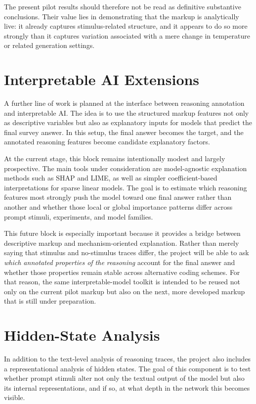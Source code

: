 \documentclass[14pt,a4paper]{extarticle}
\begin{document}
The present pilot results should therefore not be read as definitive substantive conclusions. Their value lies in demonstrating that the markup is analytically live: it already captures stimulus-related structure, and it appears to do so more strongly than it captures variation associated with a mere change in temperature or related generation settings.

\section{Interpretable AI Extensions}

A further line of work is planned at the interface between reasoning annotation and interpretable AI. The idea is to use the structured markup features not only as descriptive variables but also as explanatory inputs for models that predict the final survey answer. In this setup, the final answer becomes the target, and the annotated reasoning features become candidate explanatory factors.

At the current stage, this block remains intentionally modest and largely prospective. The main tools under consideration are model-agnostic explanation methods such as SHAP and LIME, as well as simpler coefficient-based interpretations for sparse linear models. The goal is to estimate which reasoning features most strongly push the model toward one final answer rather than another and whether those local or global importance patterns differ across prompt stimuli, experiments, and model families.

This future block is especially important because it provides a bridge between descriptive markup and mechanism-oriented explanation. Rather than merely saying that stimulus and no-stimulus traces differ, the project will be able to ask \emph{which annotated properties of the reasoning} account for the final answer and whether those properties remain stable across alternative coding schemes. For that reason, the same interpretable-model toolkit is intended to be reused not only on the current pilot markup but also on the next, more developed markup that is still under preparation.

\section{Hidden-State Analysis}

In addition to the text-level analysis of reasoning traces, the project also includes a representational analysis of hidden states. The goal of this component is to test whether prompt stimuli alter not only the textual output of the model but also its internal representations, and if so, at what depth in the network this becomes visible.
\end{document}
